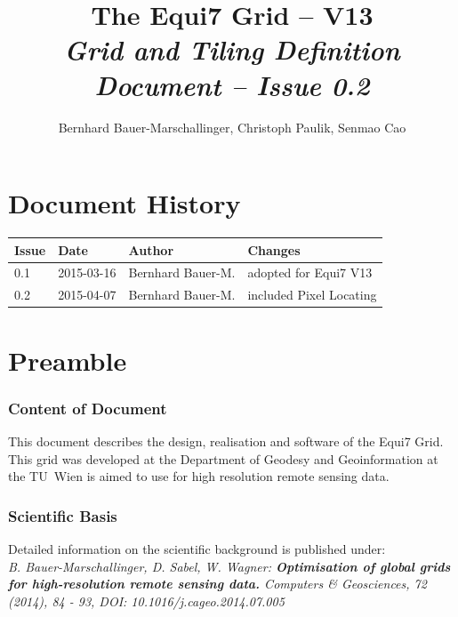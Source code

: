 \documentclass[10pt,a4paper]{article}
\begin{document}
\author{Bernhard Bauer-Marschallinger, Christoph Paulik, Senmao Cao}
\title{\textbf{The Equi7 Grid -- V13} \\ \vspace{10 mm} \Large \textbf{\textit{Grid and Tiling Definition Document -- Issue 0.2}}}
\maketitle


\newpage

\parskip 4pt
\tableofcontents

\newpage

\section*{Document History}

\begin{tabular}{llll}
\hline 
\textbf{Issue} & \textbf{Date} & \textbf{Author} & \textbf{Changes} \\ 
\hline 
0.1 & 2015-03-16 & Bernhard Bauer-M. & adopted for Equi7 V13 \\ 
0.2 & 2015-04-07 & Bernhard Bauer-M. & included Pixel Locating \\ 
\hline 
\end{tabular} 

\newpage

\section{Preamble}
\label{sec:preamble}

\subsubsection*{Content of Document}
This document describes the design, realisation and software of the Equi7 Grid. This grid was developed at the Department of Geodesy and Geoinformation at the TU~Wien is aimed to use for high resolution remote sensing data. 

\subsubsection*{Scientific Basis}
Detailed information on the scientific background is published under: \\
\textit{B. Bauer-Marschallinger, D. Sabel, W. Wagner: \textbf{Optimisation of global grids for high-resolution remote sensing data.} Computers \& Geosciences, 72 (2014), 84 - 93, DOI: 10.1016/j.cageo.2014.07.005}
\end{document}
